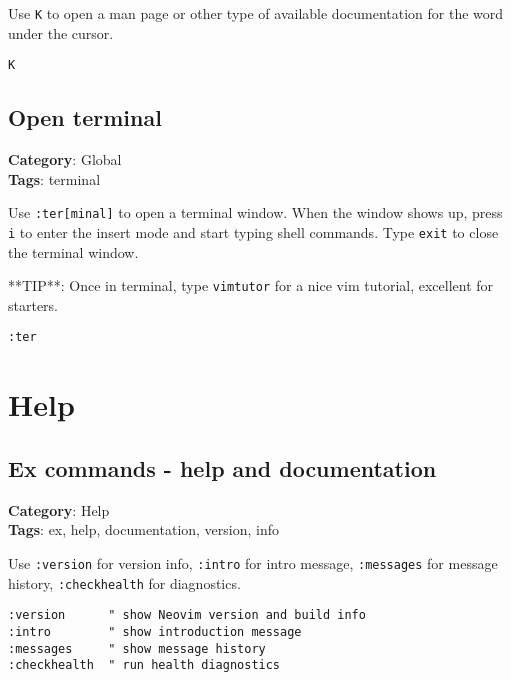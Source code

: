 {{{{{{Use {\footnotesize \Verb§K§} to open a man page or other type of available documentation for the word under the cursor. 

\begin{Exa*}{}
\begin{Verbatim}[fontsize=\footnotesize, breaklines, breakanywhere]
K
\end{Verbatim}
\end{Exa*}

\section{Open terminal}

\textbf{Category}: Global\\ \textbf{Tags}: terminal
\vspace{0.5cm}

Use {\footnotesize \Verb§:ter[minal]§} to open a terminal window. When the window shows up, press {\footnotesize \Verb§i§} to enter the insert mode and start typing shell commands. Type {\footnotesize \Verb§exit§} to close the terminal window. 

**TIP**: Once in terminal, type {\footnotesize \Verb§vimtutor§} for a nice vim tutorial, excellent for starters.

\begin{Exa*}{}
\begin{Verbatim}[fontsize=\footnotesize, breaklines, breakanywhere]
:ter
\end{Verbatim}
\end{Exa*}

\chapter{Help}
\section{Ex commands - help and documentation}

\textbf{Category}: Help\\ \textbf{Tags}: ex, help, documentation, version, info
\vspace{0.5cm}

Use {\footnotesize \Verb§:version§} for version info, {\footnotesize \Verb§:intro§} for intro message, {\footnotesize \Verb§:messages§} for message history, {\footnotesize \Verb§:checkhealth§} for diagnostics.

\begin{Exa*}{}
\begin{Verbatim}[fontsize=\footnotesize, breaklines, breakanywhere]
:version      " show Neovim version and build info
:intro        " show introduction message
:messages     " show message history
:checkhealth  " run health diagnostics
\end{Verbatim}
\end{Exa*}

}}}}}}
